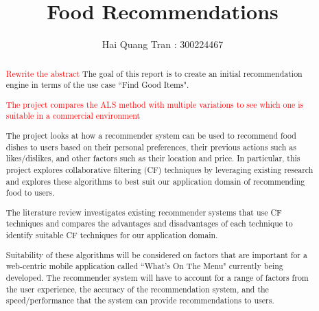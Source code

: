 \documentclass[11pt
, a4paper
, twoside
, openright
]{report}
\title{Food Recommendations}
\author{Hai Quang Tran : 300224467}
\date{}
\newcommand\todo[1]{\textcolor{red}{#1}}
\begin{document}
\frontmatter



\begin{abstract}

\todo{Rewrite the abstract}
The goal of this report is to create an initial recommendation engine in terms of the use case ``Find Good Items". 

\todo{The project compares the ALS method with multiple variations to see which one is suitable in a commercial environment}

The project looks at how a recommender system can be used to recommend food dishes to users based on their personal preferences, their previous actions such as likes/dislikes, and other factors such as their location and price. In particular, this project explores collaborative filtering (CF) techniques by leveraging existing research and explores these algorithms to best suit our application domain of recommending food to users. 

The literature review investigates existing recommender systems that use CF techniques and compares the advantages and disadvantages of each technique to identify suitable CF techniques for our application domain. 

Suitability of these algorithms will be considered on factors that are important for a web-centric mobile application called ``What's On The Menu" currently being developed. The recommender system will have to account for a range of factors from the user experience, the accuracy of the recommendation system, and the speed/performance that the system can provide recommendations to users.


\end{abstract}


\maketitle
\end{document}
